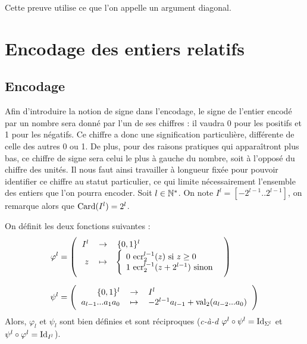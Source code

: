 		\begin{Remarque}
			Cette preuve utilise ce que l'on appelle un argument diagonal.
		\end{Remarque}
	
	\pagebreak
\section{Encodage des entiers relatifs}

	
	\subsection{Encodage}
	
		Afin d'introduire la notion de signe dans l'encodage, le signe de l'entier encodé par un nombre sera donné par l'un de ses chiffres : il vaudra 0 pour les positifs et 1 pour les négatifs. Ce chiffre a donc une signification particulière, différente de celle des autres 0 ou 1. \nt
		De plus, pour des raisons pratiques qui apparaîtront plus bas, ce chiffre de signe sera celui le plus à gauche du nombre, soit à l'opposé du chiffre des unités. Il nous faut ainsi travailler à longueur fixée pour pouvoir identifier ce chiffre au statut particulier, ce qui limite nécessairement l'ensemble des entiers que l'on pourra encoder. \nll
		Soit \(l \in \mathbb{N}^*\). On note \(I^l = [-2^{l-1}..2^{l-1}]\), on remarque alors que \(\operatorname{Card}(I^l) = 2^l\).
		
		\colsep{2.2pt}
		\eqskip{3mm}
		\begin{Proposition}
			On définit les deux fonctions suivantes :
				\begin{align*}
					\varphi^l & = \fun{I^l}{\{0,1\}^l}{z}{\!\left\{ \! \begin{tabular}[h]{l}
						\(0\,\ecr_2^{l-1}(z)\) si \(z \geq 0\) \\
						\(1\,\ecr_2^{l-1}(z+2^{l-1})\) sinon \end{tabular} \right.} \\[2mm]
					\psi^l & = \fun{\{0,1\}^l}{I^l}{a_{l-1}...a_1a_0}{-2^{l-1} a_{l-1} + \val_2(a_{l-2}...a_0)}
				\end{align*}
			Alors, \(\varphi_l\) et \(\psi_l\) sont bien définies et sont réciproques (\emph{c-à-d} \(\varphi^l\circ\psi^l = \operatorname{Id}_{\Sigma^l}\) et \(\psi^l\circ\varphi^l=\operatorname{Id}_{I^l}\)).
		\end{Proposition}
			

